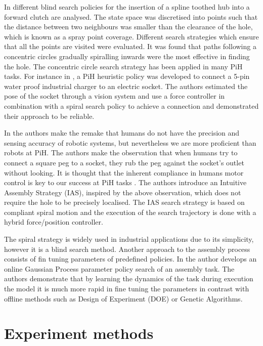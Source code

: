 \documentclass[final,3p,times,twocolumn]{elsarticle}
\begin{document}
In \cite{search_strategies_icra_2001} different blind search policies for the insertion of a spline toothed hub 
into a forward clutch are analysed. The state space was discretised into points such that the distance between two 
neighbours was smaller than the clearance of the hole, which is known as a spray point coverage. Different search 
strategies which ensure that all the points are visited were evaluated. It was found that paths following a 
concentric circles gradually spiralling inwards were the most effective in finding the hole. The concentric circle
search strategy has been applied in many PiH tasks. For instance in \cite{peg_imcssd_2015}, a PiH heuristic 
policy was developed to connect a 5-pin water proof industrial charger to an electric socket. The authors 
estimated the pose of the socket through a vision system and use a force controller in combination with a 
spiral search policy to achieve a connection and demonstrated their approach to be reliable. 

In \cite{intuitive_peg_isr_2013} the authors make the remake that humans do not have the precision and sensing 
accuracy of robotic systems, but nevertheless we are more proficient than robots at PiH. The authors make 
the observation that when humans try to connect a square peg to a socket, they rub the peg against the socket's 
outlet without looking. It is thought that the inherent compliance in humans motor control  
is key to our success at PiH tasks \cite{compliant_manip_icra_2008}. 
The authors introduce an Intuitive Assembly Strategy (IAS), inspired by the above observation, which 
does not require the hole to be precisely localised. The IAS search strategy is based on compliant 
spiral motion and the execution of the search trajectory is done with a hybrid force/position controller.

The spiral strategy is widely used in industrial applications due to its simplicity, 
however it is a blind search method. Another approach to the assembly process 
consists of fin tuning parameters of predefined policies. In \cite{online_gpr_icra_2014}
the author develops an online Gaussian Process parameter policy search of an assembly task. The authors
demonstrate that by learning the dynamics of the task during execution the model it is much more rapid in fine tuning 
the parameters in contrast with offline methods such as Design of Experiment (DOE) or Genetic Algorithms.

\section{Experiment methods}\label{ch4:experiment}
\end{document}
